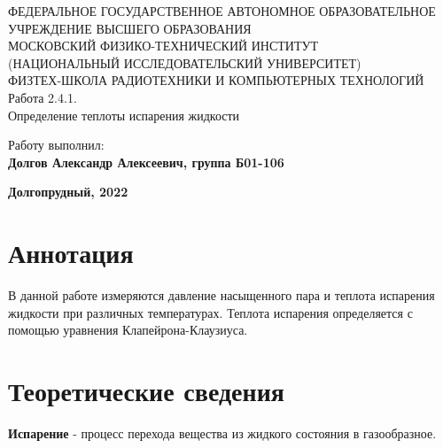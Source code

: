 \documentclass[15pt,a5paper,reqno]{article}
\begin{document}
\begin{center}
  {\small ФЕДЕРАЛЬНОЕ ГОСУДАРСТВЕННОЕ АВТОНОМНОЕ ОБРАЗОВАТЕЛЬНОЕ\\ УЧРЕЖДЕНИЕ ВЫСШЕГО ОБРАЗОВАНИЯ\\ МОСКОВСКИЙ ФИЗИКО-ТЕХНИЧЕСКИЙ ИНСТИТУТ\\ (НАЦИОНАЛЬНЫЙ ИССЛЕДОВАТЕЛЬСКИЙ УНИВЕРСИТЕТ)\\ ФИЗТЕХ-ШКОЛА РАДИОТЕХНИКИ И КОМПЬЮТЕРНЫХ ТЕХНОЛОГИЙ}\\
  \hfill \break
  \hfill \break
  \hfill \break
  \Huge{Работа 2.4.1. \\ Определение теплоты испарения жидкости}\\
\end{center}

\hfill \break
\hfill \break
\hfill \break
\hfill \break
\hfill \break
\hfill \break
\hfill \break
\hfill \break

\begin{flushright}
  \normalsize{Работу выполнил:}\\
  \normalsize{\textbf{Долгов Александр Алексеевич, группа Б01-106}}\\
\end{flushright}

\begin{center}
  \normalsize{\textbf{Долгопрудный, 2022}}
\end{center}


\thispagestyle{empty} %


\newpage
\thispagestyle{plain}
\tableofcontents
\thispagestyle{plain}
\newpage

\section{Аннотация}

    В данной работе измеряются давление насыщенного пара и теплота испарения жидкости при различных температурах. Теплота испарения определяется с помощью уравнения Клапейрона-Клаузиуса.
	
\section{Теоретические сведения}

    \textbf{Испарение} - процесс перехода вещества из жидкого состояния в газообразное. 
    
\end{document}
